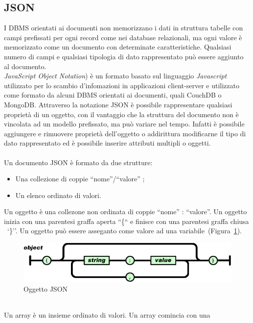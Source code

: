\newpage
\subsection{JSON}
I DBMS orientati ai documenti non memorizzano i dati in struttura tabelle con
campi prefissati per ogni record come nei database relazionali, ma ogni valore è
memorizzato come un documento con determinate caratteristiche. Qualsiasi numero
di campi e qualsiasi tipologia di dato rappresentato può essere aggiunto al
documento.
\\\emph{JavaScript Object Notation}) è un formato basato sul linguaggio
\emph{Javascript} utilizzato per lo scambio d'infomazioni in applicazioni
client-server e utilizzato come formato da alcuni DBMS orientati ai documenti,
quali CouchDB o MongoDB.
Attraverso la notazione JSON è possibile rappresentare qualsiasi proprietà di un
oggetto, con il vantaggio che la struttura del documento non è vincolata ad un
modello prefissato, ma può variare nel tempo. Infatti è possibile aggiungere e
rimuovere proprietà dell'oggetto o addirittura modificarne il tipo di dato
rappresentato ed è possibile inserire attributi multipli o oggetti.
\\\\Un documento JSON è formato da due strutture:
\begin{itemize}
  \item Una collezione di coppie ``nome''/``valore'' ;
  \item Un elenco ordinato di valori. 
\end{itemize}
Un oggetto è una collezone non ordinata di coppie ``nome'' : ``valore''. Un
oggetto inizia con una parentesi graffa aperta ``\{`` e finisce con una parentesi
graffa chiusa ~`\}''. Un oggetto può essere asseganto
come valore ad una variabile~(Figura~\ref{fig:jsondoc}).
 \begin{figure}[!h]
  \begin{center}
      \includegraphics[scale=0.50]{icons/jsondoc.png}
      \caption{Oggetto JSON}
      \label{fig:jsondoc}
  \end{center}
\end{figure}
\\Un array è un insieme ordinato di valori. Un array comincia con una
